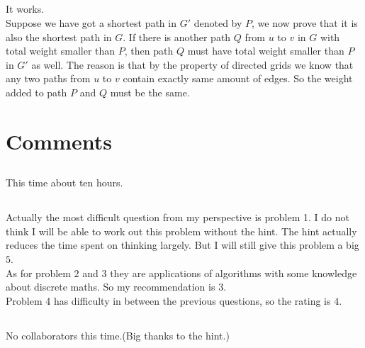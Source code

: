 \documentclass[12pt,letterpaper]{article}
\begin{document}
\subsection{}
It works. \\
Suppose we have got a shortest path in $G'$ denoted by $P$, we now prove that it is also the shortest path in $G$.
If there is another path $Q$ from $u$ to $v$ in $G$ with total weight smaller than $P$, then path $Q$ must have total weight smaller than $P$ in $G'$ as well. The reason is that by the property of directed grids we know that any two paths from $u$ to $v$ contain exactly same amount of edges. So the weight added to path $P$ and $Q$ must be the same.

\section{Comments}
\subsection{}
This time about ten hours.
\subsection{}
Actually the most difficult question from my perspective is problem 1. I do not think I will be able to work out this problem without the hint. The hint actually reduces the time spent on thinking largely. But I will still give this problem a big $5$.\\
As for problem $2$ and $3$ they are applications of algorithms with some knowledge about discrete maths. So my recommendation is $3$.\\
Problem 4 has difficulty in between the previous questions, so the rating is $4$.
\subsection{}
No collaborators this time.(Big thanks to the hint.)
\end{document}
